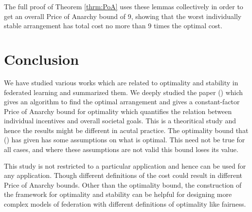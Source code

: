 \documentclass{article}
\begin{document}
The full proof of Theorem \ref{thrm:PoA} uses these lemmas collectively in order to get an overall Price of Anarchy bound of 9, showing that the worst individually stable arrangement has total cost no more than 9 times the optimal cost. 

\section{Conclusion}

We have studied various works which are related to optimality and stability in federated learning and summarized them. We deeply studied the paper (\cite{donahue2021opt}) which gives an algorithm to find the optimal arrangement and gives a constant-factor Price of Anarchy bound for optimality which quantifies the relation between individual incentives and overall societal goals. This is a theoritical study and hence the results might be different in acutal practice. The optimality bound that (\cite{donahue2021opt}) has given has some assumptions on what is optimal. This need not be true for all cases, and where these assumptions are not valid this bound loses its value.

This study is not restricted to a particular application and hence can be used for any application. Though different definitions of the cost could result in different Price of Anarchy bounds. Other than the optimality bound, the construction of the framework for optimality and stability can be helpful for designing more complex models of federation with different definitions of optimality like fairness.
\end{document}
